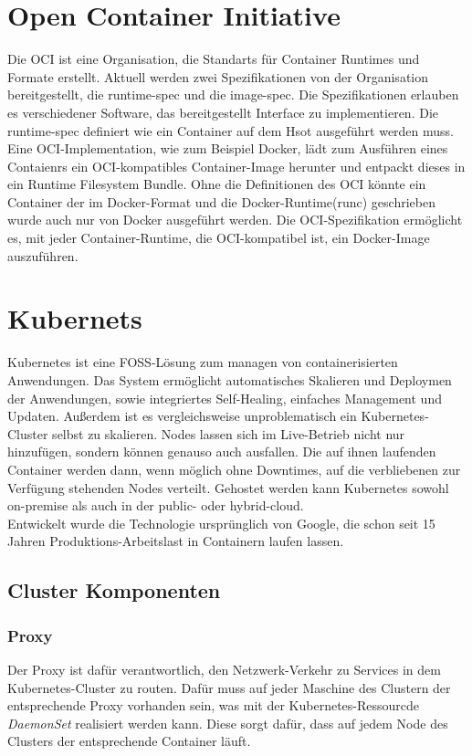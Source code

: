 \section{Open Container Initiative}
Die \ac{OCI} ist eine Organisation, die Standarts für Container Runtimes und Formate erstellt.
Aktuell werden zwei Spezifikationen von der Organisation bereitgestellt, die \ac{runtime-spec} und die \ac{image-spec}.
Die Spezifikationen erlauben es verschiedener Software, das bereitgestellt Interface zu implementieren.
Die \ac{runtime-spec} definiert wie ein Container auf dem Hsot ausgeführt werden muss. 
Eine \ac{OCI}-Implementation, wie zum Beispiel Docker, lädt zum Ausführen eines Contaienrs ein \ac{OCI}-kompatibles Container-Image herunter und entpackt dieses in ein Runtime Filesystem Bundle.
Ohne die Definitionen des \ac{OCI} könnte ein Container der im Docker-Format und die Docker-Runtime(runc) geschrieben wurde auch nur von Docker ausgeführt werden.
Die \ac{OCI}-Spezifikation ermöglicht es, mit jeder Container-Runtime, die \ac{OCI}-kompatibel ist, ein Docker-Image auszuführen. \cite{oci}



\section{Kubernets}
Kubernetes ist eine \ac{FOSS}-Lösung zum managen von containerisierten Anwendungen.
Das System ermöglicht automatisches Skalieren und Deploymen der Anwendungen, sowie integriertes Self-Healing, einfaches Management und Updaten.
Außerdem ist es vergleichsweise unproblematisch ein Kubernetes-Cluster selbst zu skalieren. 
Nodes lassen sich im Live-Betrieb nicht nur hinzufügen, sondern können genauso auch ausfallen. 
Die auf ihnen laufenden Container werden dann, wenn möglich ohne Downtimes, auf die verbliebenen zur Verfügung stehenden Nodes verteilt. 
Gehostet werden kann Kubernetes sowohl on-premise als auch in der public- oder hybrid-cloud.
\\
Entwickelt wurde die Technologie ursprünglich von Google, die schon seit 15 Jahren Produktions-Arbeitslast in Containern laufen lassen.
\cite{kubernetes}

\subsection{Cluster Komponenten}
\subsubsection{Proxy}
Der Proxy ist dafür verantwortlich, den Netzwerk-Verkehr zu Services in dem Kubernetes-Cluster zu routen. 
Dafür muss auf jeder Maschine des Clustern der entsprechende Proxy vorhanden sein, was mit der Kubernetes-Ressourcde \textit{DaemonSet} realisiert werden kann.
Diese sorgt dafür, dass auf jedem Node des Clusters der entsprechende Container läuft.\cite[S.34]{Kubernetes_up_and_running}
